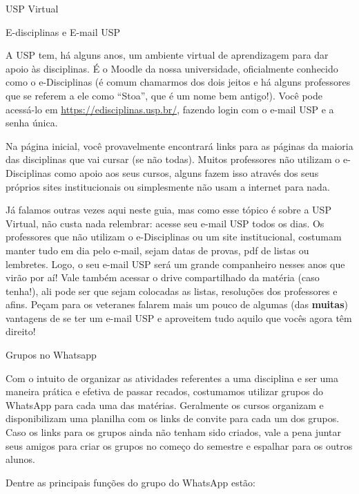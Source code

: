\begin{secao}{USP Virtual}

\begin{subsecao}{E-disciplinas e E-mail USP}

A USP tem, há alguns anos, um ambiente virtual de aprendizagem para dar apoio
às disciplinas. É o Moodle da nossa universidade, oficialmente conhecido como
o e-Disciplinas (é comum chamarmos dos dois jeitos e há alguns professores que
se referem a ele como ``Stoa'', que é um nome bem antigo!). Você pode acessá-lo em
\url{https://edisciplinas.usp.br/}, fazendo login com o e-mail USP e a senha única.

Na página inicial, você provavelmente encontrará links para as páginas da maioria
das disciplinas que vai cursar (se não todas). Muitos professores não utilizam 
o e-Disciplinas como apoio aos seus cursos, alguns fazem isso através dos seus 
próprios sites institucionais ou simplesmente não usam a internet para nada. 

Já falamos outras vezes aqui neste guia, mas como esse tópico é sobre a USP Virtual,
não custa nada relembrar: acesse seu e-mail USP todos os dias. Os professores que 
não utilizam o e-Disciplinas ou um site institucional, costumam manter tudo em dia pelo
e-mail, sejam datas de provas, pdf de listas ou lembretes. Logo, o seu e-mail USP será 
um grande companheiro nesses anos que virão por aí! Vale também acessar o drive 
compartilhado da matéria (caso tenha!), ali pode ser que sejam colocadas as listas,
resoluções dos professores e afins. Peçam para os veteranes falarem mais um pouco de
algumas (das \textbf{muitas}) vantagens de se ter um e-mail USP e aproveitem tudo aquilo
que vocês agora têm direito!

\end{subsecao}

\begin{subsecao}{Grupos no Whatsapp}

Com o intuito de organizar as atividades referentes a uma disciplina e ser uma
maneira prática e efetiva de passar recados, costumamos utilizar grupos do WhatsApp
para cada uma das matérias. Geralmente os cursos organizam e disponibilizam uma planilha
com os links de convite para cada um dos grupos. Caso os links para os grupos ainda não 
tenham sido criados, vale a pena juntar seus amigos para criar os grupos no começo do 
semestre e espalhar para os outros alunos.

Dentre as principais funções do grupo do WhatsApp estão:


\end{subsecao}
\end{secao}
